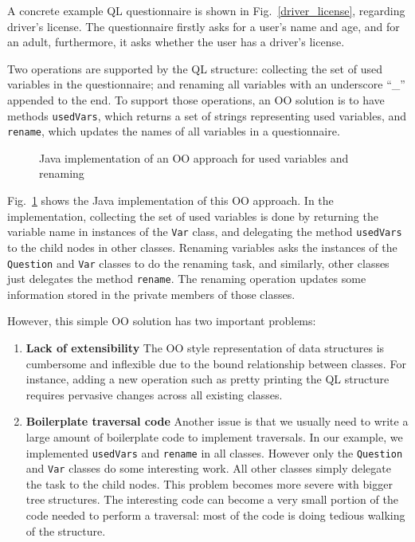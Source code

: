 A concrete example QL questionnaire is shown in Fig.~\ref{driver_license}, regarding driver's license. The questionnaire firstly asks for a user's name and age, and for an adult, furthermore, it asks whether the user has a driver's license.

Two operations are supported by the QL structure: collecting the set of used variables in the questionnaire; and renaming all variables with an underscore ``\_'' appended to the end. To support those operations, an OO solution is to have methods \lstinline{usedVars}, which returns a set of strings representing used variables, and \lstinline{rename}, which updates the names of all variables in a questionnaire.

\begin{figure}[t]
\nocaptionrule
\caption{Java implementation of an OO approach for used variables and renaming}
\label{ql_oo_approach}
\end{figure}

Fig.~\ref{ql_oo_approach} shows the Java implementation of this OO approach. In the implementation, collecting the set of used variables is done by returning the variable name in instances of the \lstinline{Var} class, and delegating the method \lstinline{usedVars} to the child nodes in other classes. Renaming variables asks the instances of the \lstinline{Question} and \lstinline{Var} classes to do the renaming task, and similarly, other classes just delegates the method \lstinline{rename}. The renaming operation updates some information stored in the private members of those classes.

However, this simple OO solution has two important problems:

\begin{enumerate}

\item {\bf Lack of extensibility} The OO style
  representation of data structures is cumbersome and
  inflexible due to the bound relationship between classes. For
  instance, adding a new operation such as pretty
  printing the QL structure requires pervasive changes across all
  existing classes.

\item {\bf Boilerplate traversal code} Another issue is that we
  usually need to write a large amount of boilerplate code to
  implement traversals. In our example, we implemented
  \lstinline{usedVars} and \lstinline{rename} in all
  classes. However only the \lstinline{Question} and \lstinline{Var} classes do some
  interesting work. All other classes simply delegate the task to the
  child nodes. This problem becomes more severe with bigger tree
  structures. The interesting code can become a very small portion of
  the code needed to perform a traversal: most of the code is doing
  tedious walking of the structure.

\end{enumerate}

